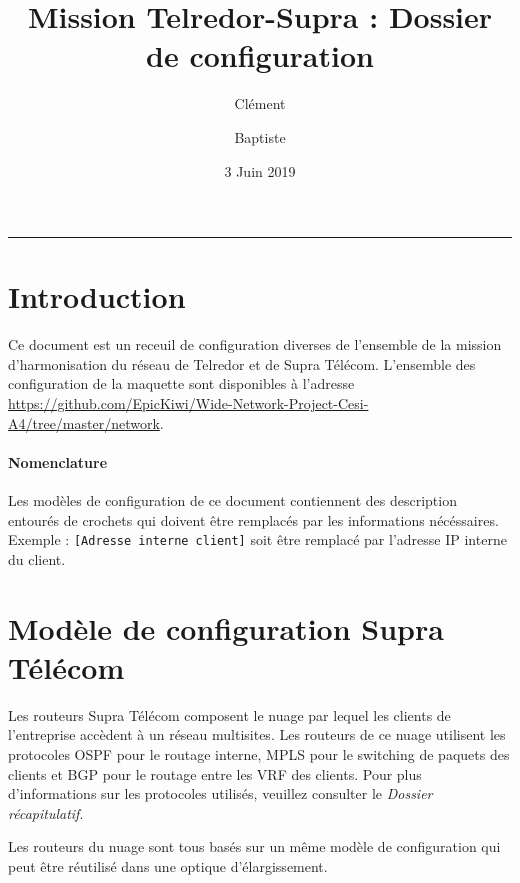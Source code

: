 \documentclass{article}
\title{Mission Telredor-Supra : Dossier de configuration}
\date{3 Juin 2019}
\author{Clément \bsc{Boutin} \and Baptiste \bsc{Saclier}}
\newcommand{\tlr}{Telredor\xspace}
\newcommand{\spr}{Supra Télécom\xspace}
\begin{document}
\maketitle

\begin{center}
\rule{0.5\textwidth}{0.4pt}
\end{center}

\tableofcontents

\section{Introduction}

Ce document est un receuil de configuration diverses de l'ensemble de la mission d'harmonisation du réseau de \tlr et de \spr.
L'ensemble des configuration de la maquette sont disponibles à l'adresse \url{https://github.com/EpicKiwi/Wide-Network-Project-Cesi-A4/tree/master/network}.

\paragraph{Nomenclature} Les modèles de configuration de ce document contiennent des description entourés de crochets qui doivent être remplacés par les informations nécéssaires.
Exemple : \texttt{\color{PineGreen}[Adresse interne client]} soit être remplacé par l'adresse IP interne du client.

\section{Modèle de configuration \spr}

Les routeurs \spr composent le nuage par lequel les clients de l'entreprise accèdent à un réseau multisites.
Les routeurs de ce nuage utilisent les protocoles OSPF pour le routage interne, MPLS pour le switching de paquets des clients et BGP pour le routage entre les VRF des clients.
Pour plus d'informations sur les protocoles utilisés, veuillez consulter le \emph{Dossier récapitulatif}.

Les routeurs du nuage sont tous basés sur un même modèle de configuration qui peut être réutilisé dans une optique d'élargissement.
\end{document}
